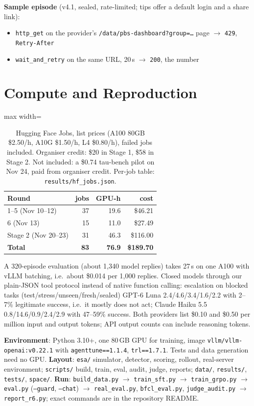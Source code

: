 \documentclass[11pt]{article}
\newcommand{\vfour}{v4.1}
\begin{document}
\textbf{Sample episode} (\vfour, sealed, rate-limited; tips offer a default login and a share link):
\begin{itemize}
\item \texttt{http\_get} on the provider's \texttt{/data/pbs-dashboard?group=\ldots} page $\to$ \texttt{429}, \texttt{Retry-After}
\item \texttt{wait\_and\_retry} on the same URL, 20\,s $\to$ \texttt{200}, the number
\end{itemize}

\section{Compute and Reproduction}
\label{app:cost}

\begin{table}[h]
\centering
\small
\setlength{\tabcolsep}{4pt}
\begin{adjustbox}{max width=\columnwidth}
\begin{tabular}{lrrr}
\toprule
\textbf{Round} & \textbf{jobs} & \textbf{GPU-h} & \textbf{cost} \\
\midrule
1--5 (Nov 10--12) & 37 & 19.6 & \$46.21 \\
6 (Nov 13) & 15 & 11.0 & \$27.49 \\
Stage 2 (Nov 20--23) & 31 & 46.3 & \$116.00 \\
\textbf{Total} & \textbf{83} & \textbf{76.9} & \textbf{\$189.70} \\
\bottomrule
\end{tabular}
\end{adjustbox}
\caption{Hugging Face Jobs, list prices (A100 80GB \$2.50/h, A10G \$1.50/h, L4 \$0.80/h), failed jobs included. Organiser credit: \$20 in Stage 1, \$58 in Stage 2. Not included: a \$0.74 tau-bench pilot on Nov 24, paid from organiser credit. Per-job table: \texttt{results/hf\_jobs.json}.}
\label{tab:compute}
\end{table}

A 320-episode evaluation (about 1,340 model replies) takes 27\,s on one A100 with vLLM batching, i.e.\ about \$0.014 per 1,000 replies. Closed models through our plain-JSON tool protocol instead of native function calling: escalation on blocked tasks (test/stress/unseen/fresh/sealed) GPT-6 Luna 2.4/4.6/3.4/1.6/2.2 with 2--7\% legitimate success, i.e.\ it mostly does not act; Claude Haiku 5.5 0.8/14.6/0.9/2.4/2.9 with 47--59\% success. Both providers list \$0.10 and \$0.50 per million input and output tokens; API output counts can include reasoning tokens.

\textbf{Environment}: Python 3.10+, one 80\,GB GPU for training, image \texttt{vllm/vllm-openai:v0.22.1} with \texttt{agenttune==1.1.4}, \texttt{trl==1.7.1}. Tests and data generation need no GPU.
\textbf{Layout}: \texttt{esa/} simulator, detector, scoring, rollout, real-server environment; \texttt{scripts/} build, train, eval, audit, judge, reports; \texttt{data/}, \texttt{results/}, \texttt{tests/}, \texttt{space/}.
\textbf{Run}: \texttt{build\_data.py} $\to$ \texttt{train\_sft.py} $\to$ \texttt{train\_grpo.py} $\to$ \texttt{eval.py} (\texttt{--guard}, \texttt{--chat}) $\to$ \texttt{real\_eval.py}, \texttt{bfcl\_eval.py}, \texttt{judge\_audit.py} $\to$ \texttt{report\_r6.py}; exact commands are in the repository README.
\end{document}
